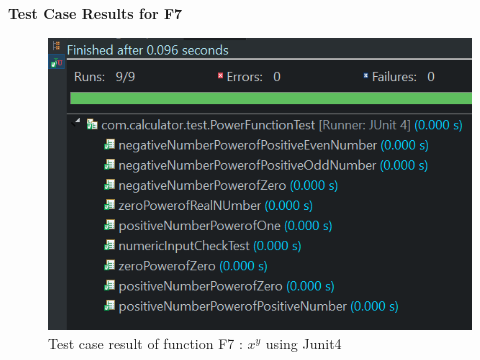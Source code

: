 \documentclass[letterpaper, 11pt]{report}
\begin{document}
\textbf{Test Case Results for F7}
\begin{figure}[htb]
\begin{center}
\includegraphics[width=13cm]{TestCases_Results_F7}
  \centering
  \caption{ Test case result of function F7 : \(x^y\)  using Junit4
}
\end{center}
\end{figure}
\end{document}

